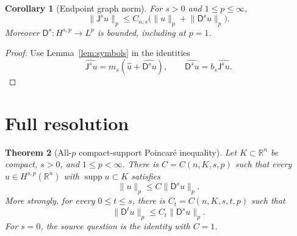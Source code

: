 \documentclass[11pt]{article}
\newtheorem{theorem}{Theorem}
\newtheorem{corollary}[theorem]{Corollary}
\newcommand{\R}{\mathbb R}
\newcommand{\supp}{\operatorname{supp}}
\newcommand{\D}{\mathsf D}
\newcommand{\J}{\mathsf J}
\newcommand{\norm}[1]{\lVert #1\rVert}
\begin{document}
\begin{corollary}[Endpoint graph norm]\label{cor:graph}
For \(s>0\) and \(1\leq p\leq\infty\),
\begin{equation}\label{eq:graph}
 \norm{\J^su}_p\leq C_{n,s}
 \bigl(\norm u_p+\norm{\D^su}_p\bigr).
\end{equation}
Moreover \(\D^s:H^{s,p}\to L^p\) is bounded, including at \(p=1\).
\end{corollary}

\begin{proof}
Use Lemma~\ref{lem:symbols} in the identities
\[
 \widehat{\J^su}=m_s(\widehat u+\widehat{\D^su}),\qquad
 \widehat{\D^su}=b_s\widehat{\J^su}.
\]
\end{proof}

\section*{Full resolution}

\begin{theorem}[All-\(p\) compact-support Poincar\'e inequality]
\label{thm:main}
Let \(K\subset\R^n\) be compact, \(s>0\), and \(1\leq p<\infty\).  There
is \(C=C(n,K,s,p)\) such that every \(u\in H^{s,p}(\R^n)\) with
\(\supp u\subset K\) satisfies
\begin{equation}\label{eq:main}
 \norm u_p\leq C\norm{\D^su}_p.
\end{equation}
More strongly, for every \(0\leq t\leq s\), there is
\(C_t=C(n,K,s,t,p)\) such that
\begin{equation}\label{eq:allt}
 \norm{\D^tu}_p\leq C_t\norm{\D^su}_p.
\end{equation}
For \(s=0\), the source question is the identity with \(C=1\).
\end{theorem}
\end{document}
